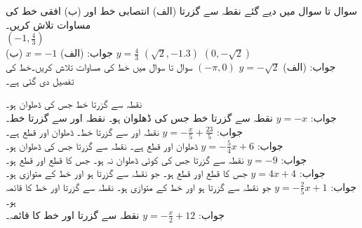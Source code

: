 سوال  تا سوال  میں دیے گئے نقطہ سے گزرتا (الف) انتصابی خط اور (ب) افقی خط کی مساوات تلاش کریں۔\\

$(-1,\tfrac{4}{3})$\\
جواب:\quad
(الف) 
$x=-1$\quad 
(ب) 
$y=\tfrac{4}{3}$
$(\sqrt{2},-1.3)$
$(0,-\sqrt{2})$\\
جواب:\quad
(الف)  
\quad
$y=-\sqrt{2}$
$(-\pi,0)$
سوال  تا سوال  میں خط کی مساوات تلاش کریں۔خط کی تفصیل دی گئی ہے۔

نقطہ  سے گزرتا خط جس کی ڈھلوان  ہو۔\\
جواب:\quad
$y=-x$
نقطہ  سے گزرتا خط جس کی ڈھلوان  ہو۔
نقطہ  اور  سے گزرتا خط۔\\
جواب:\quad
$y=-\tfrac{x}{5}+\tfrac{23}{5}$
نقطہ  اور  سے گزرتا خط۔
ڈھلوان  اور  قطع  ہے۔\\
جواب:\quad
$y=-\tfrac{5}{4}x+6$
ڈھلوان  اور  قطع  ہے۔
نقطہ  سے گزرتا جس کی ڈھلوان  ہو۔\\
جواب:\quad
$y=-9$
نقطہ  سے گزرتا جس کی کوئی  ڈھلوان نہ ہو۔
جس کا  قطع  اور  قطع  ہو۔\\
جواب:\quad
$y=4x+4$
جس کا  قطع  اور  قطع  ہو۔
جو نقطہ  سے گزرتا ہو اور خط  کے متوازی ہو۔\\
جواب:\quad
$y=-\tfrac{2}{5}x+1$
جو نقطہ  سے گزرتا ہو اور خط  کے متوازی ہو۔
نقطہ  سے گزرتا اور خط  کا قائمہ ہو۔\\
جواب:\quad
$y=-\tfrac{x}{2}+12$
نقطہ  سے گزرتا اور خط  کا قائمہ۔

